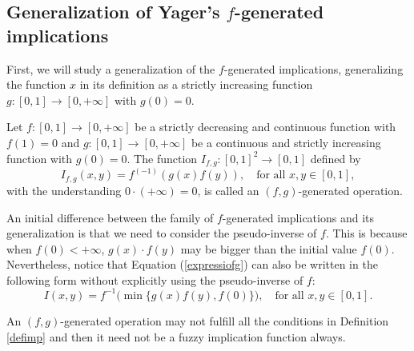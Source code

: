 \subsection{Generalization of Yager's $f$-generated implications}\label{subsection:f-generated}

First, we will study a generalization of the $f$-generated implications, generalizing the function $x$ in its definition as a strictly increasing function $g: [0,1] \to [0, + \infty]$ with $g(0)=0$.
\begin{definition}\label{def:(f,g)operations} Let $f:[0,1] \to [0,+\infty]$ be a strictly decreasing and continuous function with $f(1)=0$ and $g:[0,1] \to [0, + \infty]$ be a continuous and strictly increasing function with $g(0)=0$. The function $I_{f,g} : [0,1]^2 \to [0,1]$ defined by
	\begin{equation}
		I_{f,g}(x,y)=f^{(-1)}(g(x)f(y)),  \quad \text{for all } x,y \in [0,1],
		\label{expressiofg}
	\end{equation}
	\noindent with the understanding $0 \cdot (+\infty)=0$, is called an $(f,g)$-generated operation.
\end{definition}

\begin{remark} An initial difference between the family of $f$-generated implications and its generalization is that we need to consider the pseudo-inverse of $f$. This is because when $f(0) < + \infty$, $g(x) \cdot f(y)$ may be bigger than the initial value $f(0)$. Nevertheless, notice that Equation (\ref{expressiofg}) can also be written in the following form without explicitly using the pseudo-inverse of $f$:
	\begin{equation}
		I(x,y)=f^{-1}\Big(\min \Big\lbrace g(x)f(y),f(0) \Big\rbrace \Big), \quad \text{for all } x,y \in [0,1].
		\label{expressio2fg}
	\end{equation}
\end{remark}

An $(f,g)$-generated operation may not fulfill all the conditions in Definition \ref{defimp} and then it need not be a fuzzy implication function always.


